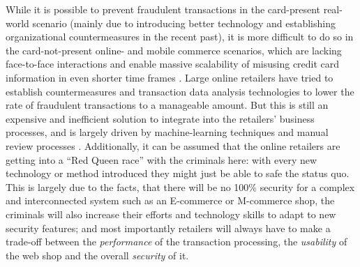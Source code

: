 While it is possible to prevent fraudulent transactions in the card-present real-world scenario (mainly due to introducing better technology and establishing organizational countermeasures in the recent past), it is more difficult to do so in the card-not-present online- and mobile commerce scenarios, which are lacking face-to-face interactions and enable massive scalability of misusing credit card information in even shorter time frames \citep{Lewis2015}. Large online retailers have tried to establish countermeasures and transaction data analysis technologies to lower the rate of fraudulent transactions to a manageable amount. But this is still an expensive and inefficient solution to integrate into the retailers’ business processes, and is largely driven by machine-learning techniques and manual review processes \citep{Brachmann2015}. Additionally, it can be assumed that the online retailers are getting into a ``Red Queen race'' with the criminals here: with every new technology or method introduced they might just be able to safe the status quo. This is largely due to the facts, that there will be no 100\% security for a complex and interconnected system such as an E-commerce or M-commerce shop, the criminals will also increase their efforts and technology skills to adapt to new security features; and most importantly retailers will always have to make a trade-off between the \textit{performance} of the transaction processing, the \textit{usability} of the web shop and the overall \textit{security} of it.

